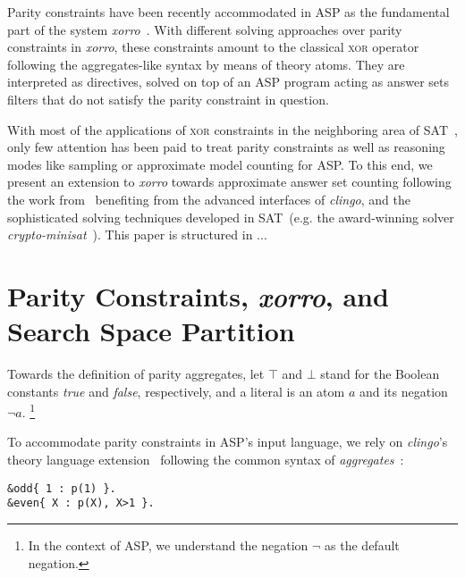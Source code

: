 \documentclass{article}
\newcommand{\XOR}{\textsc{xor}} %
\newcommand{\sysfont}{\textit}
\newcommand{\clingo}{\sysfont{clingo}}
\newcommand{\xorro}{\sysfont{xorro}}
\newcommand{\cryptominisat}{\sysfont{crypto-minisat}}
\newcommand{\true}{\top}
\newcommand{\false}{\bot}
\begin{document}
Parity constraints have been recently accommodated in ASP
as the fundamental part of the system \xorro{}~\cite{DBLP:conf/lpnmr/EverardoJKS19}.
% 
With different solving approaches over parity constraints in \xorro{}, these constraints amount to the classical \XOR{} operator following the aggregates-like syntax by means of theory atoms.
They are interpreted as directives, solved on top of an ASP program acting as answer sets filters that do not satisfy the parity constraint in question.
%



%
With most of the applications of \XOR{} constraints in the neighboring area of SAT~\cite{DBLP:journals/corr/abs-1806-02239},
only few attention has been paid to treat parity constraints as well as reasoning modes like sampling or approximate model counting for ASP. %
%
To this end, we present an extension to \xorro{} towards approximate answer set counting following the work from~\cite{DBLP:conf/cp/ChakrabortyMV13}
benefiting from the advanced interfaces of \clingo{},
and the sophisticated solving techniques developed in SAT~(e.g. the award-winning solver \cryptominisat~\cite{DBLP:conf/sat/SoosNC09}).
%
This paper is structured in ...

\section{Parity Constraints, \emph{xorro}, and Search Space Partition} \label{sec:hashing}

Towards the definition of parity aggregates, let $\true$ and $\false$
stand for the Boolean constants \emph{true} and \emph{false},
respectively, and a literal is an atom $a$ and its negation $\neg a$.
\footnote{In the context of ASP, we understand the negation $\neg$ as the default negation.}

To accommodate parity constraints in ASP's input language,
we rely on \clingo’s theory language extension~\cite{DBLP:conf/iclp/GebserKKOSW16}
following the common syntax of \emph{aggregates}~\cite{DBLP:journals/tplp/GebserHKLS15}:

%
\begin{verbatim}
&odd{ 1 : p(1) }.
&even{ X : p(X), X>1 }.
\end{verbatim}
\end{document}

